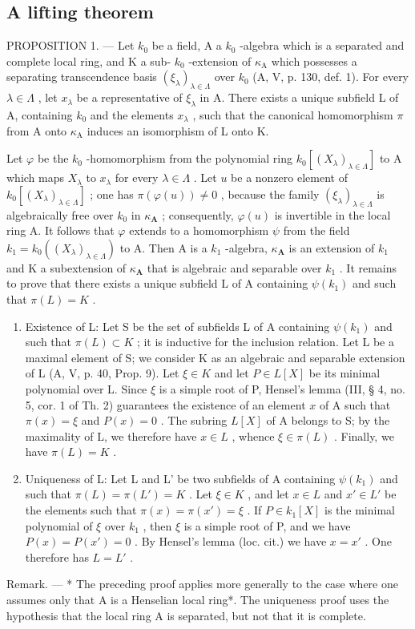 \subsection{A lifting theorem}

PROPOSITION 1. --- Let \(k_{0}\) be a field, A a \(k_{0}\) -algebra which is a separated and complete local ring, and K a sub- \(k_{0}\) -extension of \(\kappa_{\mathrm{A}}\) which possesses a separating transcendence basis \((\xi_{\lambda})_{\lambda \in \Lambda}\) over \(k_{0}\) (A, V, p. 130, def. 1). For every \(\lambda \in \Lambda\) , let \(x_{\lambda}\) be a representative of \(\xi_{\lambda}\) in A. There exists a unique subfield L of A, containing \(k_{0}\) and the elements \(x_{\lambda}\) , such that the canonical homomorphism \(\pi\) from A onto \(\kappa_{\mathrm{A}}\) induces an isomorphism of L onto K.

Let \(\varphi\) be the \(k_{0}\) -homomorphism from the polynomial ring \(k_{0}[(X_{\lambda})_{\lambda \in \Lambda}]\) to A which maps \(X_{\lambda}\) to \(x_{\lambda}\) for every \(\lambda \in \Lambda\) . Let \(u\) be a nonzero element of \(k_{0}[(X_{\lambda})_{\lambda \in \Lambda}]\) ; one has \(\pi (\varphi (u)) \neq 0\) , because the family \((\xi_{\lambda})_{\lambda \in \Lambda}\) is algebraically free over \(k_{0}\) in \(\kappa_{\mathbf{A}}\) ; consequently, \(\varphi (u)\) is invertible in the local ring A. It follows that \(\varphi\) extends to a homomorphism \(\psi\) from the field \(k_{1} = k_{0}((X_{\lambda})_{\lambda \in \Lambda})\) to A. Then A is a \(k_{1}\) -algebra, \(\kappa_{\mathbf{A}}\) is an extension of \(k_{1}\) and K a subextension of \(\kappa_{\mathbf{A}}\) that is algebraic and separable over \(k_{1}\) . It remains to prove that there exists a unique subfield L of A containing \(\psi(k_{1})\) and such that \(\pi(L) = K\) .

\begin{enumerate}
\def\labelenumi{\alph{enumi})}
\item
  Existence of L: Let S be the set of subfields L of A containing \(\psi(k_1)\) and such that \(\pi(L) \subset K\) ; it is inductive for the inclusion relation. Let L be a maximal element of S; we consider K as an algebraic and separable extension of L (A, V, p. 40, Prop. 9). Let \(\xi \in K\) and let \(P \in L[X]\) be its minimal polynomial over L. Since \(\xi\) is a simple root of P, Hensel's lemma (III, § 4, no. 5, cor. 1 of Th. 2) guarantees the existence of an element \(x\) of A such that \(\pi(x) = \xi\) and \(P(x) = 0\) . The subring \(L[X]\) of A belongs to S; by the maximality of L, we therefore have \(x \in L\) , whence \(\xi \in \pi(L)\) . Finally, we have \(\pi(L) = K\) .
\item
  Uniqueness of L: Let L and L' be two subfields of A containing \(\psi(k_1)\) and such that \(\pi(L) = \pi(L') = K\) . Let \(\xi \in K\) , and let \(x \in L\) and \(x' \in L'\) be the elements such that \(\pi(x) = \pi(x') = \xi\) . If \(P \in k_1[X]\) is the minimal polynomial of \(\xi\) over \(k_1\) , then \(\xi\) is a simple root of P, and we have \(P(x) = P(x') = 0\) . By Hensel's lemma (loc. cit.) we have \(x = x'\) . One therefore has \(L = L'\) .
\end{enumerate}

Remark. --- * The preceding proof applies more generally to the case where one assumes only that A is a Henselian local ring*. The uniqueness proof uses the hypothesis that the local ring A is separated, but not that it is complete.

